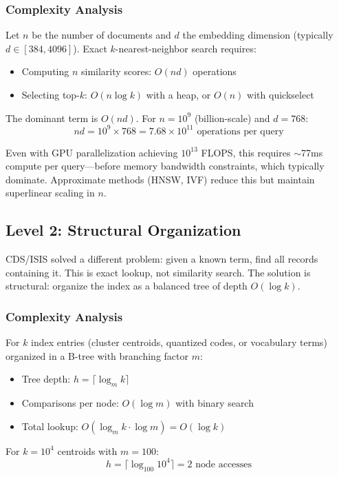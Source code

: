 \documentclass[manuscript,screen,nonacm]{acmart}
\begin{document}
\subsubsection{Complexity Analysis}
Let $n$ be the number of documents and $d$ the embedding dimension (typically $d \in [384, 4096]$). Exact $k$-nearest-neighbor search requires:
\begin{itemize}
    \item Computing $n$ similarity scores: $O(nd)$ operations
    \item Selecting top-$k$: $O(n \log k)$ with a heap, or $O(n)$ with quickselect
\end{itemize}

The dominant term is $O(nd)$. For $n = 10^9$ (billion-scale) and $d = 768$:
\[
nd = 10^9 \times 768 = 7.68 \times 10^{11} \text{ operations per query}
\]

Even with GPU parallelization achieving $10^{13}$ FLOPS, this requires $\sim$77ms compute per query---before memory bandwidth constraints, which typically dominate. Approximate methods (HNSW, IVF) reduce this but maintain superlinear scaling in $n$.

\subsection{Level 2: Structural Organization}

CDS/ISIS solved a different problem: given a known term, find all records containing it. This is exact lookup, not similarity search. The solution is structural: organize the index as a balanced tree of depth $O(\log k)$.

\subsubsection{Complexity Analysis}
For $k$ index entries (cluster centroids, quantized codes, or vocabulary terms) organized in a B-tree with branching factor $m$:
\begin{itemize}
    \item Tree depth: $h = \lceil \log_m k \rceil$
    \item Comparisons per node: $O(\log m)$ with binary search
    \item Total lookup: $O(\log_m k \cdot \log m) = O(\log k)$
\end{itemize}

For $k = 10^4$ centroids with $m = 100$:
\[
h = \lceil \log_{100} 10^4 \rceil = 2 \text{ node accesses}
\]
\end{document}
